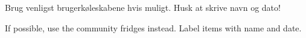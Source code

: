 \documentclass{article}
\begin{document}
\maketitle

\null
\vspace{-1cm}

\begin{center}
\huge


\vspace{-0.5cm}

Brug venligst brugerkøleskabene hvis muligt. Husk at skrive navn og dato!

\english

\vspace{0.2cm}


\vspace{-0.7cm}

If possible, use the community fridges instead. Label items with name and date.

\end{center}

\underskriv
\end{document}
